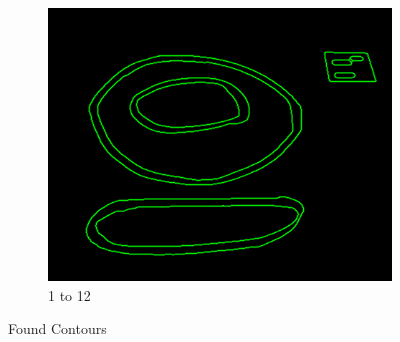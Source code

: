 \documentclass[11pt]{article}
\begin{document}
\begin{figure}[H]
\begin{subfigure}[t]{0.32\textwidth}
		\includegraphics[scale=0.28]{pics/elimination/joinedAfterRemoval12.png}
		\caption{1 to 12}
		\label{construction12}
	\end{subfigure}
	\caption{Found Contours}
	\label{construction}
\end{figure}
\end{document}
